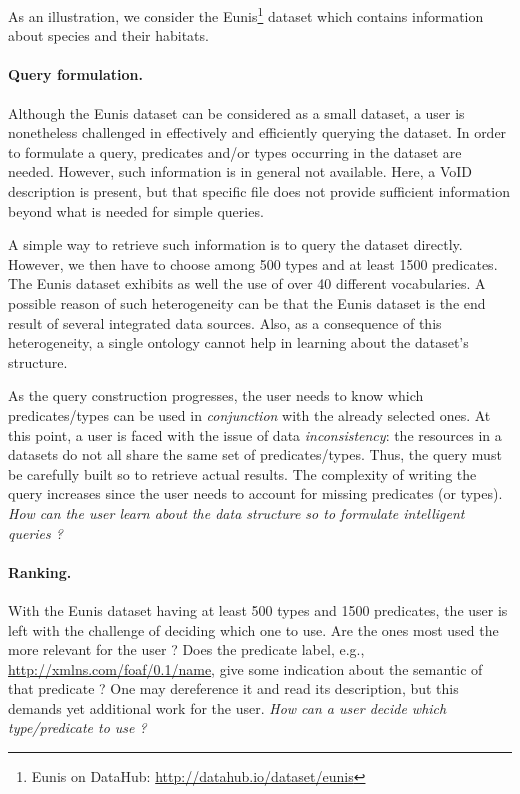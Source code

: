 As an illustration, we consider the Eunis\footnote{Eunis on DataHub: \url{http://datahub.io/dataset/eunis}} dataset which contains information about species and their habitats.

\paragraph{Query formulation.}

Although the Eunis dataset can be considered as a small dataset, a user is nonetheless challenged in effectively and efficiently querying the dataset. In order to formulate a query, predicates and/or types occurring in the dataset are needed. However, such information is in general not available. Here, a VoID~\cite{alexander:2009:dld} description is present, but that specific file does not provide sufficient information beyond what is needed for simple queries.

A simple way to retrieve such information is to query the dataset directly. However, we then have to choose among 500 types and at least 1500 predicates. The Eunis dataset exhibits as well the use of over 40 different vocabularies. A possible reason of such heterogeneity can be that the Eunis dataset is the end result of several integrated data sources. Also, as a consequence of this heterogeneity, a single ontology cannot help in learning about the dataset's structure.

As the query construction progresses, the user needs to know which predicates/types can be used in \emph{conjunction} with the already selected ones. At this point, a user is faced with the issue of data \emph{inconsistency}: the resources in a datasets do not all share the same set of predicates/types. Thus, the query must be carefully built so to retrieve actual results. The complexity of writing the query increases since the user needs to account for missing predicates (or types). \textit{How can the user learn about the data structure so to formulate intelligent queries ?}

\paragraph{Ranking.}

With the Eunis dataset having at least 500 types and 1500 predicates, the user is left with the challenge of deciding which one to use. Are the ones most used the more relevant for the user ? Does the predicate label, e.g., \url{http://xmlns.com/foaf/0.1/name}, give some indication about the semantic of that predicate ? One may dereference it and read its description, but this demands yet additional work for the user. \textit{How can a user decide which type/predicate to use ?}

